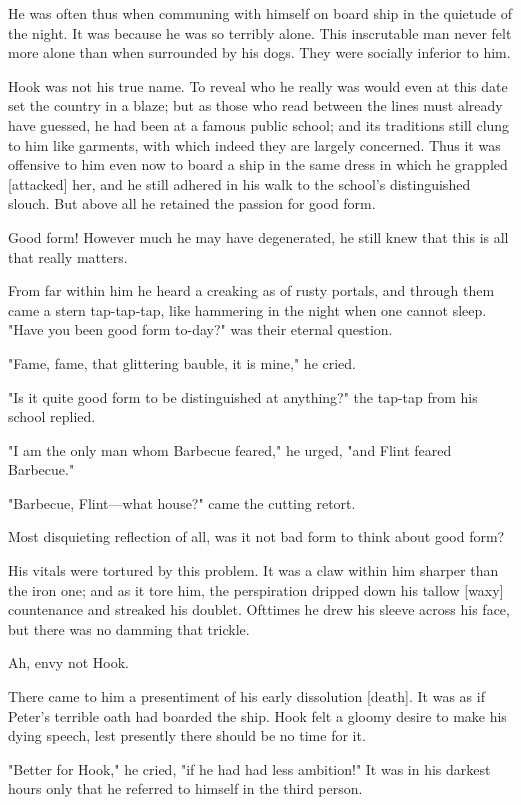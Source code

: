 He was often thus when communing with himself on board ship in the
quietude of the night. It was because he was so terribly alone. This
inscrutable man never felt more alone than when surrounded by his dogs.
They were socially inferior to him.


Hook was not his true name. To reveal who he really was would even at this
date set the country in a blaze; but as those who read between the lines
must already have guessed, he had been at a famous public school; and its
traditions still clung to him like garments, with which indeed they are
largely concerned. Thus it was offensive to him even now to board a ship
in the same dress in which he grappled [attacked] her, and he still
adhered in his walk to the school's distinguished slouch. But above all he
retained the passion for good form.


Good form! However much he may have degenerated, he still knew that this
is all that really matters.


From far within him he heard a creaking as of rusty portals, and through
them came a stern tap-tap-tap, like hammering in the night when one cannot
sleep. "Have you been good form to-day?" was their eternal question.


"Fame, fame, that glittering bauble, it is mine," he cried.


"Is it quite good form to be distinguished at anything?" the tap-tap from
his school replied.


"I am the only man whom Barbecue feared," he urged, "and Flint feared
Barbecue."


"Barbecue, Flint—what house?" came the cutting retort.


Most disquieting reflection of all, was it not bad form to think about
good form?


His vitals were tortured by this problem. It was a claw within him sharper
than the iron one; and as it tore him, the perspiration dripped down his
tallow [waxy] countenance and streaked his doublet. Ofttimes he drew his
sleeve across his face, but there was no damming that trickle.


Ah, envy not Hook.


There came to him a presentiment of his early dissolution [death]. It was
as if Peter's terrible oath had boarded the ship. Hook felt a gloomy
desire to make his dying speech, lest presently there should be no time
for it.


"Better for Hook," he cried, "if he had had less ambition!" It was in his
darkest hours only that he referred to himself in the third person.


